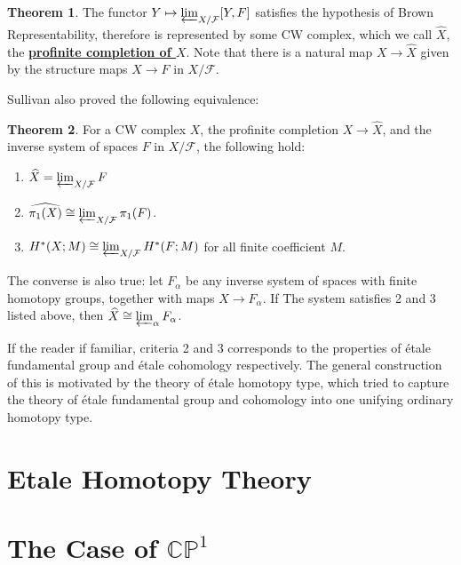 \documentclass{article}
\theoremstyle{definition}
\newtheorem{theorem}{Theorem}[section]
\theoremstyle{definition}
\theoremstyle{definition}
\theoremstyle{definition}
\theoremstyle{definition}
\theoremstyle{definition}
\theoremstyle{definition}
\begin{document}
\begin{tcolorbox}[colback=red!5!white,colframe=red!30!white]
\begin{theorem}
The functor $Y\mapsto \varprojlim_{X/\mathcal{F}}[Y,F]$ satisfies the hypothesis of Brown Representability, therefore is represented by some CW complex, which we call $\widehat{X}$, the \underline{\textbf{profinite completion of $X$}}. Note that there is a natural map $X\to \widehat{X}$ given by the structure maps $X\to F$ in $X/\mathcal{F}$.
\end{theorem}
\end{tcolorbox}
Sullivan also proved the following equivalence:

\begin{tcolorbox}[colback=red!5!white,colframe=red!30!white]
\begin{theorem}
For a CW complex $X$, the profinite completion $X\to \widehat{X}$, and the inverse system of spaces ${F}$ in $X/\mathcal{F}$, the following hold:
\begin{enumerate}
	\item $\widehat{X}=\varprojlim_{X/\mathcal{F}}F$
	\item $\widehat{\pi_1(X)}\cong \varprojlim_{X/\mathcal{F}}\pi_1(F)$.
	\item $H^*(X;M)\cong \varprojlim_{X/\mathcal{F}}H^*(F;M)$ for all finite coefficient $M$.
\end{enumerate}
The converse is also true: let ${F_{\alpha}}$ be any inverse system of spaces with finite homotopy groups, together with maps $X\to F_{\alpha}$. If The system satisfies 2 and $3$ listed above, then $\widehat{X}\cong \varprojlim_{\alpha} F_{\alpha}$.
\end{theorem}
\end{tcolorbox}

If the reader if familiar, criteria 2 and 3 corresponds to the properties of \'etale fundamental group and  \'etale cohomology respectively. The general construction of this is motivated by the theory of \'etale homotopy type, which tried to capture the theory of \'etale fundamental group and cohomology into one unifying ordinary homotopy type. 

\section{Etale Homotopy Theory}








\section{The Case of $\mathbb{CP}^1$}
\end{document}
